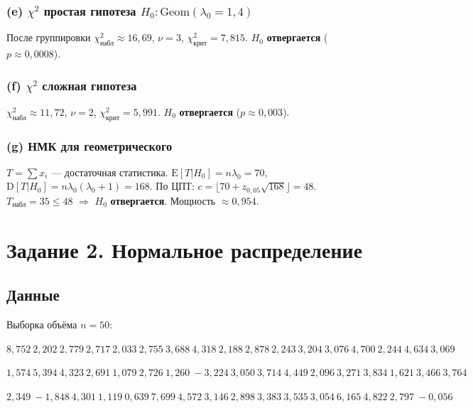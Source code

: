 \documentclass[12pt,a4paper]{article}
\begin{document}
	\subsubsection*{(e) $\chi^2$ простая гипотеза $H_0\colon \mathrm{Geom}(\lambda_0=1{,}4)$}
	После группировки $\chi^2_{\text{набл}} \approx 16{,}69$, $\nu=3$,
	$\chi^2_{\text{крит}} = 7{,}815$. $H_0$ \textbf{отвергается} ($p \approx 0{,}0008$).
	
	\subsubsection*{(f) $\chi^2$ сложная гипотеза}
	$\chi^2_{\text{набл}} \approx 11{,}72$, $\nu=2$, $\chi^2_{\text{крит}}=5{,}991$.
	$H_0$ \textbf{отвергается} ($p \approx 0{,}003$).
	
	\subsubsection*{(g) НМК для геометрического}
	$T = \sum x_i$ --- достаточная статистика.
	$\mathrm{E}[T|H_0] = n\lambda_0 = 70$, $\mathrm{D}[T|H_0] = n\lambda_0(\lambda_0+1) = 168$.
	По ЦПТ: $c = \lfloor 70 + z_{0{,}05}\sqrt{168}\rfloor = 48$.
	$T_{\text{набл}} = 35 \le 48$ $\Rightarrow$ $H_0$ \textbf{отвергается}. Мощность $\approx 0{,}954$.
	
	\newpage
	\section{Задание 2. Нормальное распределение}
	
	\subsection*{Данные}
	Выборка объёма $n = 50$:
	
	\noindent
	$8{,}752\ 2{,}202\ 2{,}779\ 2{,}717\ 2{,}033\ 2{,}755\ 3{,}688\ 4{,}318\ 2{,}188\ 2{,}878\
	2{,}243\ 3{,}204\ 3{,}076\ 4{,}700\ 2{,}244\ 4{,}634\ 3{,}069$

	\noindent
	$1{,}574\ 5{,}394\ 4{,}323\ 2{,}691\ 1{,}079\ 2{,}726\ 1{,}260\ {-}3{,}224\ 3{,}050\ 3{,}714\ 4{,}449\ 2{,}096\ 3{,}271\ 3{,}834\ 1{,}621\ 3{,}466\ 3{,}764$
	
	\noindent
	$2{,}349\ {-}1{,}848\ 4{,}301\ 1{,}119\ 0{,}639\ 7{,}699\ 4{,}572\ 3{,}146\ 2{,}898\ 3{,}383\ 3{,}535\ 3{,}054\ 6{,}165\ 4{,}822\ 2{,}797\ {-}0{,}056$
	
\end{document}
